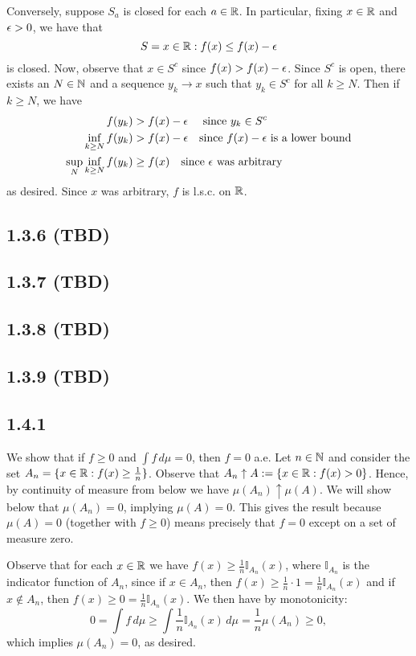 \documentclass[11pt]{article}
\begin{document}
Conversely, suppose $S_a$ is closed for each $a \in {\mathbb R}$. In particular, fixing $x \in {\mathbb R}$ and $\epsilon > 0$, we have that \[S = x \in {\mathbb R} : f(x) \leq f(x) - \epsilon\] is closed. Now, observe that $x \in S^c$ since $f(x) > f(x) - \epsilon$. Since $S^c$ is open, there exists an $N \in {\mathbb N}$ and a sequence $y_k \to x$ such that $y_k \in S^c$ for all $k \geq N$. Then if $k \geq N$, we have \begin{align*}
    f(y_k) &> f(x) - \epsilon \quad \text{ since $y_k \in S^c$} \\
    \inf_{k \geq N} f(y_k) &> f(x) - \epsilon \quad \text{since $f(x)-\epsilon$ is a lower bound} \\
    \sup_{N} \inf_{k \geq N} f(y_k) &\geq f(x) \quad \text{since $\epsilon$ was arbitrary}
\end{align*} as desired. Since $x$ was arbitrary, $f$ is l.s.c. on ${\mathbb R}$.

\subsection*{1.3.6 (TBD)}

\subsection*{1.3.7 (TBD)}

\subsection*{1.3.8 (TBD)} 

\subsection*{1.3.9 (TBD)}

\subsection*{1.4.1}

We show that if $f \geq 0$ and $\int f \, d\mu = 0$, then $f = 0$ a.e. Let $n \in {\mathbb N}$ and consider the set $A_n = \{x \in {\mathbb R} : f(x) \geq \frac{1}{n}\}$. Observe that $A_n \uparrow A := \{x \in {\mathbb R} : f(x) > 0\}$. Hence, by continuity of measure from below we have $\mu(A_n)\uparrow \mu(A)$. We will show below that $\mu(A_n) = 0$, implying $\mu(A) = 0$. This gives the result because $\mu(A) = 0$ (together with $f \geq 0$) means precisely that $f = 0$ except on a set of measure zero.

Observe that for each $x \in {\mathbb R}$ we have $f(x) \geq  \frac{1}{n} \mathbb{I}_{A_n}(x)$, where $\mathbb{I}_{A_n}$ is the indicator function of $A_n$, since if $x \in A_n$, then $f(x) \geq \frac{1}{n} \cdot 1 = \frac{1}{n}\mathbb{I}_{A_n}(x)$ and if $x \notin A_n$, then $f(x) \geq 0 = \frac{1}{n}\mathbb{I}_{A_n}(x)$. We then have by monotonicity: \[0 = \int f \, d\mu  \geq \int  \frac{1}{n}\mathbb{I}_{A_n}(x)\, d\mu  =  \frac{1}{n}\mu(A_n) \geq 0,\] which implies $\mu(A_n) = 0$, as desired.
\end{document}
